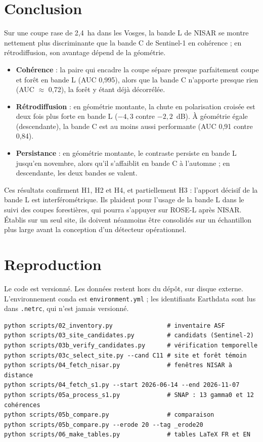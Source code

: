 \documentclass[11pt,a4paper]{article}
\begin{document}
\section{Conclusion}

Sur une coupe rase de 2,4~ha dans les Vosges, la bande L de NISAR se montre nettement plus discriminante que la
bande C de Sentinel-1 en cohérence ; en rétrodiffusion, son avantage dépend de la géométrie.
\begin{itemize}
\item \textbf{Cohérence} : la paire qui encadre la coupe sépare presque parfaitement coupe et forêt en bande L
  (AUC 0,995), alors que la bande C n'apporte presque rien (AUC $\approx$ 0,72), la forêt y étant déjà décorrélée.
\item \textbf{Rétrodiffusion} : en géométrie montante, la chute en polarisation croisée est deux fois plus forte
  en bande L ($-4{,}3$ contre $-2{,}2$~dB). À géométrie égale (descendante), la bande C est au moins aussi
  performante (AUC 0,91 contre 0,84).
\item \textbf{Persistance} : en géométrie montante, le contraste persiste en bande L jusqu'en novembre, alors qu'il
  s'affaiblit en bande C à l'automne ; en descendante, les deux bandes se valent.
\end{itemize}
Ces résultats confirment H1, H2 et H4, et partiellement H3 : l'apport décisif de la bande L est
interférométrique. Ils plaident pour l'usage de la bande L dans le suivi des coupes forestières, qui pourra
s'appuyer sur ROSE-L après NISAR. Établis sur un seul site, ils doivent néanmoins être consolidés sur un
échantillon plus large avant la conception d'un détecteur opérationnel.

\printbibliography[heading=bibintoc,title={Références}]

\appendix
\section{Reproduction}

Le code est versionné. Les données restent hors du dépôt, sur disque externe. L'environnement conda est
\texttt{environment.yml} ; les identifiants Earthdata sont lus dans \texttt{.netrc}, qui n'est jamais versionné.

\begin{verbatim}
python scripts/02_inventory.py               # inventaire ASF
python scripts/03_site_candidates.py         # candidats (Sentinel-2)
python scripts/03b_verify_candidates.py      # vérification temporelle
python scripts/03c_select_site.py --cand C11 # site et forêt témoin
python scripts/04_fetch_nisar.py             # fenêtres NISAR à distance
python scripts/04_fetch_s1.py --start 2026-06-14 --end 2026-11-07
python scripts/05a_process_s1.py             # SNAP : 13 gamma0 et 12 cohérences
python scripts/05b_compare.py                # comparaison
python scripts/05b_compare.py --erode 20 --tag _erode20
python scripts/06_make_tables.py             # tables LaTeX FR et EN
\end{verbatim}
\end{document}
